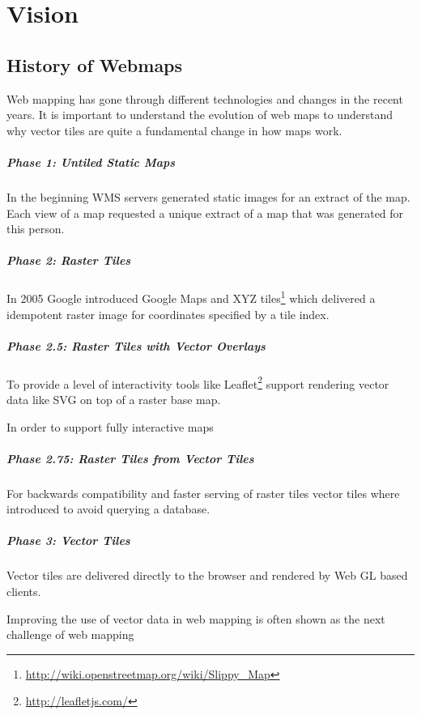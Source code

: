 \chapter{Vision}\label{vision}

\section{History of Webmaps}
\label{history-of-webmaps}

Web mapping has gone through different technologies and changes in
the recent years. It is important to understand the evolution of web maps to understand why vector tiles are quite a fundamental change in how maps work.

\paragraph{Phase 1: Untiled Static
Maps}

In the beginning WMS servers generated static images for an extract
of the map. Each view of a map requested a unique extract of a map that was generated for this person.


\paragraph{Phase 2: Raster Tiles}

In 2005 Google introduced Google Maps and XYZ 
tiles\footnote{\url{http://wiki.openstreetmap.org/wiki/Slippy_Map}}
which delivered a idempotent raster image for coordinates specified by a
tile index.


\paragraph{Phase 2.5: Raster Tiles with Vector
Overlays}

To provide a level of interactivity tools like
Leaflet\footnote{\url{http://leafletjs.com/}} support rendering vector
data like SVG on top of a raster base map.

In order to support fully interactive maps 

\paragraph{Phase 2.75: Raster Tiles from Vector
Tiles}

For backwards compatibility and faster serving of raster tiles vector
tiles where introduced to avoid querying a database.

\paragraph{Phase 3: Vector Tiles}

Vector tiles are delivered directly to the browser and rendered by Web
GL based clients.


Improving the use of vector data in web mapping is often shown as the next challenge
of web mapping \cite[p.~88]{gaffuri2012toward} 
